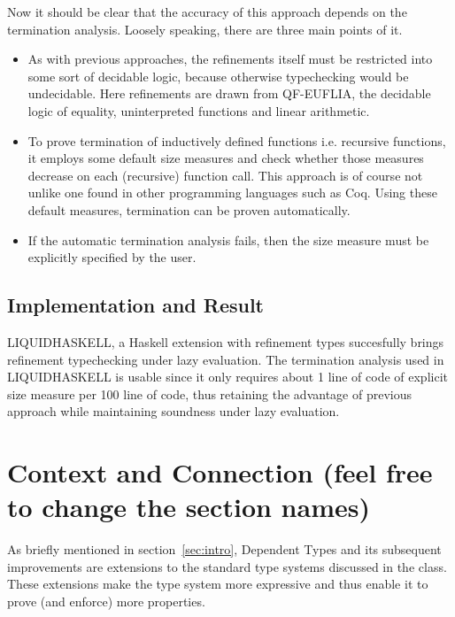 \documentclass[a4paper,UKenglish]{lipics-v2016}
\begin{document}
      Now it should be clear that the accuracy of this approach depends on the
      termination analysis.  Loosely speaking, there are three main points of
      it.
      \begin{itemize}
        \item As with previous approaches, the refinements itself must be
          restricted into some sort of decidable logic, because otherwise
          typechecking would be undecidable.  Here refinements are drawn from
          QF-EUFLIA, the decidable logic of equality, uninterpreted
          functions and linear arithmetic.
        \item To prove termination of inductively defined functions i.e.
          recursive functions, it employs some default size measures and check
          whether those measures decrease on each (recursive) function call.
          This approach is of course not unlike one found in other programming
          languages such as Coq. Using these default measures, termination can
          be proven automatically.
        \item If the automatic termination analysis fails, then the size
          measure must be explicitly specified by the user.
      \end{itemize}

    \subsection{Implementation and Result}
      
      LIQUIDHASKELL, a Haskell extension with refinement types succesfully
      brings refinement typechecking under lazy evaluation.  The termination
      analysis used in LIQUIDHASKELL is usable since it only requires about 1
      line of code of explicit size measure per 100 line of code, thus
      retaining the advantage of previous approach while maintaining soundness
      under lazy evaluation.

\section{Context and Connection (feel free to change the section names)}

  As briefly mentioned in section~\ref{sec:intro}, Dependent Types and its
  subsequent improvements are extensions to the standard type systems discussed
  in the class.  These extensions make the type system more expressive and thus
  enable it to prove (and enforce) more properties.
\end{document}
